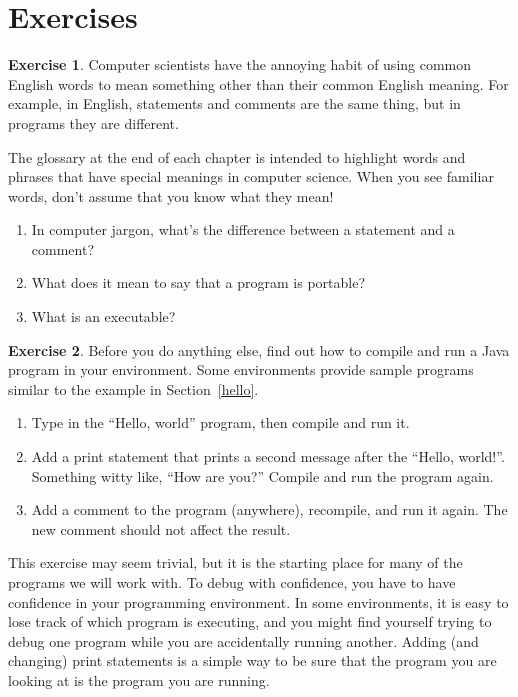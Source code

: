 \documentclass[12pt]{book}
\theoremstyle{definition}
\newtheorem{excz}{Exercise}[chapter]
\newenvironment{exercise}{\bigskip\begin{excz}\mbox{}}{\end{excz}}
\begin{document}
\section{Exercises}

\begin{exercise}

Computer scientists have the annoying habit of using common
English words to mean something other than their common
English meaning.  For example, in English, statements and
comments are the same thing, but in programs they are different.

The glossary at the end of each chapter is intended to highlight
words and phrases that have special meanings in computer science.
When you see familiar words, don't assume that you know what 
they mean!

\begin{enumerate}

\item In computer jargon, what's the difference between a statement
and a comment?

\item What does it mean to say that a program is portable?

\item What is an executable?

\end{enumerate}

\end{exercise}

\begin{exercise}

Before you do anything else, find out how to compile and run a Java
program in your environment.  Some environments provide sample programs
similar to the example in Section~\ref{hello}.

\begin{enumerate}

\item Type in the ``Hello, world'' program, then compile and run it.

\item Add a print statement that prints a second message after
the ``Hello, world!''.  Something witty like, ``How are you?''
Compile and run the program again.

\item Add a comment to the program (anywhere), recompile, and run
it again.  The new comment should not affect the result.

\end{enumerate}

This exercise may seem trivial, but it is the starting place for many
of the programs we will work with.  To debug with confidence,
you have to have confidence in your programming environment.  In some
environments, it is easy to lose track of which program is executing,
and you might find yourself trying to debug one program while you are
accidentally running another.  Adding (and changing) print statements
is a simple way to be sure that the program you are looking at is
the program you are running.

\end{exercise}
\end{document}
